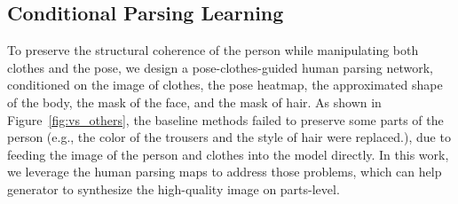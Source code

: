 \documentclass[10pt,twocolumn,letterpaper]{article}
\begin{document}
\subsection{Conditional Parsing Learning}
To preserve the structural coherence of the person while manipulating both clothes and the pose, we design a pose-clothes-guided human parsing network, conditioned on the image of clothes, the pose heatmap, the approximated shape of the body, the mask of the face, and the mask of hair. As shown in Figure~\ref{fig:vs_others}, the baseline methods failed to preserve some parts of the person (e.g., the color of the trousers and the style of hair were replaced.), due to feeding the image of the person and clothes into the model directly. In this work, we leverage the human parsing maps to address those problems, which can help generator to synthesize the high-quality image on parts-level.
\end{document}
